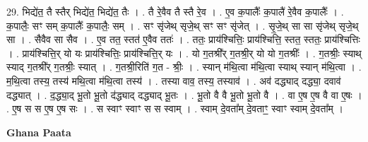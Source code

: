 \documentclass[17pt]{extarticle}
\begin{document}
29. भिद्ये॑त॒ तै स्तैर् भिद्ये॑त॒ भिद्ये॑त॒ तैः । . तै रे॒वैव तै स्तै रे॒व । . ए॒व क॒पालैः᳚ क॒पालै॑ रे॒वैव क॒पालैः᳚ । . क॒पालैः॒ सꣳ सम् क॒पालैः᳚ क॒पालैः॒ सम् । . सꣳ सृ॑जेथ् सृजे॒थ् सꣳ सꣳ सृ॑जेत् । . सृ॒जे॒थ् सा सा सृ॑जेथ् सृजे॒थ् सा । . सैवैव सा सैव । . ए॒व तत॒ स्तत॑ ए॒वैव ततः॑ । . ततः॒ प्राय॑श्चित्तिः॒ प्राय॑श्चित्ति॒ स्तत॒ स्ततः॒ प्राय॑श्चित्तिः । . प्राय॑श्चित्ति॒र् यो यः प्राय॑श्चित्तिः॒ प्राय॑श्चित्ति॒र् यः । . यो ग॒तश्री᳚र् ग॒तश्री॒र् यो यो ग॒तश्रीः᳚ । . ग॒तश्रीः॒ स्याथ् स्याद् ग॒तश्री᳚र् ग॒तश्रीः॒ स्यात् । . ग॒तश्री॒रिति॑ ग॒त - श्रीः॒ । . स्यान् म॑थि॒त्वा म॑थि॒त्वा स्याथ् स्यान् म॑थि॒त्वा । . म॒थि॒त्वा तस्य॒ तस्य॑ मथि॒त्वा म॑थि॒त्वा तस्य॑ । . तस्या वाव॒ तस्य॒ तस्याव॑ । . अव॑ दद्ध्याद् दद्ध्या॒ दवाव॑ दद्ध्यात् । . द॒द्ध्या॒द् भू॒तो भू॒तो द॑द्ध्याद् दद्ध्याद् भू॒तः । . भू॒तो वै वै भू॒तो भू॒तो वै । . वा ए॒ष ए॒ष वै वा ए॒षः । . ए॒ष स स ए॒ष ए॒ष सः । . स स्वाꣳ स्वाꣳ स स स्वाम् । . स्वाम् दे॒वता᳚म् दे॒वताꣳ॒॒ स्वाꣳ स्वाम् दे॒वता᳚म् । \newline

\textbf{Ghana Paata } \newline
\end{document}
